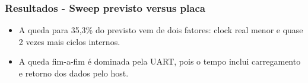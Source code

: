 \documentclass{beamer}
\begin{document}
\begin{frame}
\frametitle{Resultados - Sweep previsto versus placa}

\begin{table}
\centering
\small
\caption{Comparação entre o resultado previsto pelo sweep e a execução real da \texttt{run\_20260609\_143308}.}
\end{table}

\vspace{0.05cm}
\begin{itemize}
    \item A queda para 35,3\% do previsto vem de dois fatores: clock real menor e quase 2 vezes mais ciclos internos.
    \item A queda fim-a-fim é dominada pela UART, pois o tempo inclui carregamento e retorno dos dados pelo host.
\end{itemize}

\end{frame}
\end{document}
